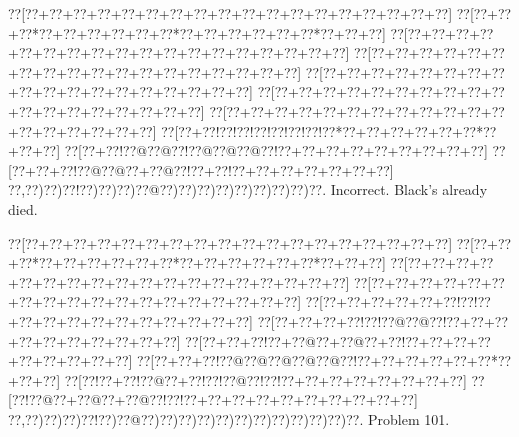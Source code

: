 \documentclass[a5paper]{article}
\begin{document}
\begin{center}
{\goo
\0??[\0??+\0??+\0??+\0??+\0??+\0??+\0??+\0??+\0??+\0??+\0??+\0??+\0??+\0??+\0??+\0??+\0??+\0??]
\0??[\0??+\0??+\0??*\0??+\0??+\0??+\0??+\0??+\0??*\0??+\0??+\0??+\0??+\0??+\0??*\0??+\0??+\0??]
\0??[\0??+\0??+\0??+\0??+\0??+\0??+\0??+\0??+\0??+\0??+\0??+\0??+\0??+\0??+\0??+\0??+\0??+\0??]
\0??[\0??+\0??+\0??+\0??+\0??+\0??+\0??+\0??+\0??+\0??+\0??+\0??+\0??+\0??+\0??+\0??+\0??+\0??]
\0??[\0??+\0??+\0??+\0??+\0??+\0??+\0??+\0??+\0??+\0??+\0??+\0??+\0??+\0??+\0??+\0??+\0??+\0??]
\0??[\0??+\0??+\0??+\0??+\0??+\0??+\0??+\0??+\0??+\0??+\0??+\0??+\0??+\0??+\0??+\0??+\0??+\0??]
\0??[\0??+\0??+\0??+\0??+\0??+\0??+\0??+\0??+\0??+\0??+\0??+\0??+\0??+\0??+\0??+\0??+\0??+\0??]
\0??[\0??+\0??!\0??!\0??!\0??!\0??!\0??!\0??!\0??*\0??+\0??+\0??+\0??+\0??+\0??*\0??+\0??+\0??]
\0??[\0??+\0??!\0??@\0??@\0??!\0??@\0??@\0??@\0??!\0??+\0??+\0??+\0??+\0??+\0??+\0??+\0??+\0??]
\0??[\0??+\0??+\0??!\0??@\0??@\0??+\0??@\0??!\0??+\0??!\0??+\0??+\0??+\0??+\0??+\0??+\0??]
\0??,\0??)\0??)\0??!\0??)\0??)\0??)\0??@\0??)\0??)\0??)\0??)\0??)\0??)\0??)\0??)\0??.
}
Incorrect. Black's already died. 

\end{center}
\newpage
\begin{center}
{\goo
\0??[\0??+\0??+\0??+\0??+\0??+\0??+\0??+\0??+\0??+\0??+\0??+\0??+\0??+\0??+\0??+\0??+\0??+\0??]
\0??[\0??+\0??+\0??*\0??+\0??+\0??+\0??+\0??+\0??*\0??+\0??+\0??+\0??+\0??+\0??*\0??+\0??+\0??]
\0??[\0??+\0??+\0??+\0??+\0??+\0??+\0??+\0??+\0??+\0??+\0??+\0??+\0??+\0??+\0??+\0??+\0??+\0??]
\0??[\0??+\0??+\0??+\0??+\0??+\0??+\0??+\0??+\0??+\0??+\0??+\0??+\0??+\0??+\0??+\0??+\0??+\0??]
\0??[\0??+\0??+\0??+\0??+\0??+\0??!\0??!\0??+\0??+\0??+\0??+\0??+\0??+\0??+\0??+\0??+\0??+\0??]
\0??[\0??+\0??+\0??+\0??!\0??!\0??@\0??@\0??!\0??+\0??+\0??+\0??+\0??+\0??+\0??+\0??+\0??+\0??]
\0??[\0??+\0??+\0??!\0??+\0??@\0??+\0??@\0??+\0??!\0??+\0??+\0??+\0??+\0??+\0??+\0??+\0??+\0??]
\0??[\0??+\0??+\0??!\0??@\0??@\0??@\0??@\0??@\0??!\0??+\0??+\0??+\0??+\0??+\0??*\0??+\0??+\0??]
\0??[\0??!\0??+\0??!\0??@\0??+\0??!\0??!\0??@\0??!\0??!\0??+\0??+\0??+\0??+\0??+\0??+\0??+\0??]
\0??[\0??!\0??@\0??+\0??@\0??+\0??@\0??!\0??!\0??+\0??+\0??+\0??+\0??+\0??+\0??+\0??+\0??+\0??]
\0??,\0??)\0??)\0??)\0??!\0??)\0??@\0??)\0??)\0??)\0??)\0??)\0??)\0??)\0??)\0??)\0??)\0??)\0??.
}
Problem 101.

\end{center}
\end{document}
